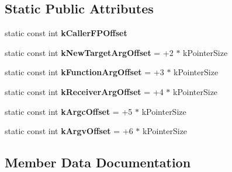\subsection*{Static Public Attributes}
\begin{DoxyCompactItemize}
\item 
static const int {\bfseries k\+Caller\+F\+P\+Offset}
\item 
static const int {\bfseries k\+New\+Target\+Arg\+Offset} = +2 $\ast$ k\+Pointer\+Size\hypertarget{classv8_1_1internal_1_1_entry_frame_constants_aeb4254632f87eb805c1f5b47586a1df9}{}\label{classv8_1_1internal_1_1_entry_frame_constants_aeb4254632f87eb805c1f5b47586a1df9}

\item 
static const int {\bfseries k\+Function\+Arg\+Offset} = +3 $\ast$ k\+Pointer\+Size\hypertarget{classv8_1_1internal_1_1_entry_frame_constants_a39f8f8c3e455e289ca2122ce297a8e0d}{}\label{classv8_1_1internal_1_1_entry_frame_constants_a39f8f8c3e455e289ca2122ce297a8e0d}

\item 
static const int {\bfseries k\+Receiver\+Arg\+Offset} = +4 $\ast$ k\+Pointer\+Size\hypertarget{classv8_1_1internal_1_1_entry_frame_constants_ab881f85e4193635f982b0aa2e3f1eae1}{}\label{classv8_1_1internal_1_1_entry_frame_constants_ab881f85e4193635f982b0aa2e3f1eae1}

\item 
static const int {\bfseries k\+Argc\+Offset} = +5 $\ast$ k\+Pointer\+Size\hypertarget{classv8_1_1internal_1_1_entry_frame_constants_a3f302553e9a91d9a205d70e49e5abd22}{}\label{classv8_1_1internal_1_1_entry_frame_constants_a3f302553e9a91d9a205d70e49e5abd22}

\item 
static const int {\bfseries k\+Argv\+Offset} = +6 $\ast$ k\+Pointer\+Size\hypertarget{classv8_1_1internal_1_1_entry_frame_constants_af9b213e4de6f5f847b11a6e318f72c06}{}\label{classv8_1_1internal_1_1_entry_frame_constants_af9b213e4de6f5f847b11a6e318f72c06}

\end{DoxyCompactItemize}


\subsection{Member Data Documentation}
